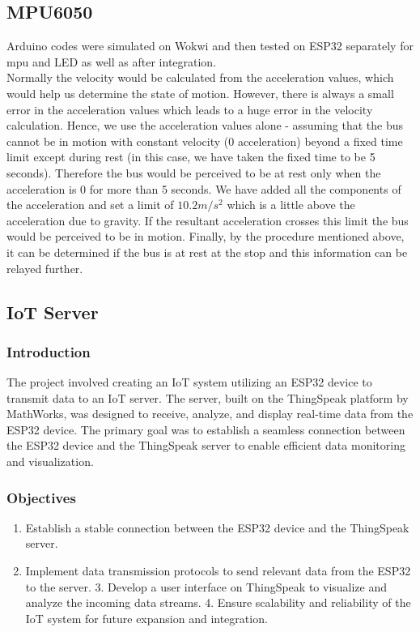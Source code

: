 \documentclass[12pt]{article} %
\begin{document}
\subsection{MPU6050}
Arduino codes were simulated on Wokwi and then tested on ESP32 separately for
mpu and LED as well as after integration.
\vspace{10pt}
\\Normally the velocity would be calculated from the acceleration values, which
would help us determine the state of motion. However, there is always a small
error in the acceleration values which leads to a huge error in the velocity
calculation. Hence, we use the acceleration values alone - assuming that the bus
cannot be in motion with constant velocity (0 acceleration) beyond a fixed time
limit except during rest (in this case, we have taken the fixed time to be 5
seconds). Therefore the bus would be perceived to be at rest only when the
acceleration is 0 for more than 5 seconds.
We have added all the components of the acceleration and set a limit of $10.2 m/s^2$ which is a little above the acceleration due to gravity. If the
resultant acceleration crosses this limit the bus would be perceived to be in
motion.
Finally, by the procedure mentioned above, it can be determined if the bus is at
rest at the stop and this information can be relayed further.

\subsection{IoT Server}

\subsubsection{Introduction}
The project involved creating an IoT system utilizing an ESP32 device to transmit data to an IoT server. The server, built on the ThingSpeak platform by MathWorks, was designed to receive, analyze, and display real-time data from the ESP32 device. The primary goal was to establish a seamless connection between the ESP32 device and the ThingSpeak server to enable efficient data monitoring and visualization.

\subsubsection{Objectives}
\begin{enumerate}
    \item Establish a stable connection between the ESP32 device and the ThingSpeak server.
    \item Implement data transmission protocols to send relevant data from the ESP32 to the server. 3. Develop a user interface on ThingSpeak to visualize and analyze the incoming data streams. 4. Ensure scalability and reliability of the IoT system for future expansion and integration.
\end{enumerate}
\end{document}

